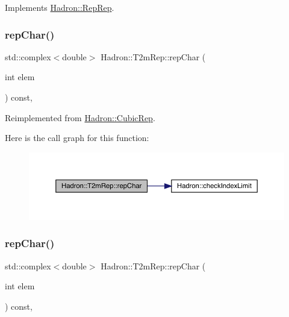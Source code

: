 Implements \mbox{\hyperlink{structHadron_1_1RepRep_ab3213025f6de249f7095892109575fde}{Hadron\+::\+Rep\+Rep}}.

\mbox{\label{structHadron_1_1T2mRep_af6775da2b681eda429dc3a5c026cc877}} 
\subsubsection{\texorpdfstring{repChar()}{repChar()}\hspace{0.1cm}{\footnotesize\ttfamily [1/2]}}
{\footnotesize\ttfamily std\+::complex$<$double$>$ Hadron\+::\+T2m\+Rep\+::rep\+Char (\begin{DoxyParamCaption}\item[{int}]{elem }\end{DoxyParamCaption}) const\hspace{0.3cm}{\ttfamily [inline]}, {\ttfamily [virtual]}}



Reimplemented from \mbox{\hyperlink{structHadron_1_1CubicRep_af45227106e8e715e84b0af69cd3b36f8}{Hadron\+::\+Cubic\+Rep}}.

Here is the call graph for this function\+:
\nopagebreak
\begin{figure}[H]
\begin{center}
\leavevmode
\includegraphics[width=350pt]{d7/dc8/structHadron_1_1T2mRep_af6775da2b681eda429dc3a5c026cc877_cgraph}
\end{center}
\end{figure}
\mbox{\label{structHadron_1_1T2mRep_af6775da2b681eda429dc3a5c026cc877}} 
\subsubsection{\texorpdfstring{repChar()}{repChar()}\hspace{0.1cm}{\footnotesize\ttfamily [2/2]}}
{\footnotesize\ttfamily std\+::complex$<$double$>$ Hadron\+::\+T2m\+Rep\+::rep\+Char (\begin{DoxyParamCaption}\item[{int}]{elem }\end{DoxyParamCaption}) const\hspace{0.3cm}{\ttfamily [inline]}, {\ttfamily [virtual]}}



